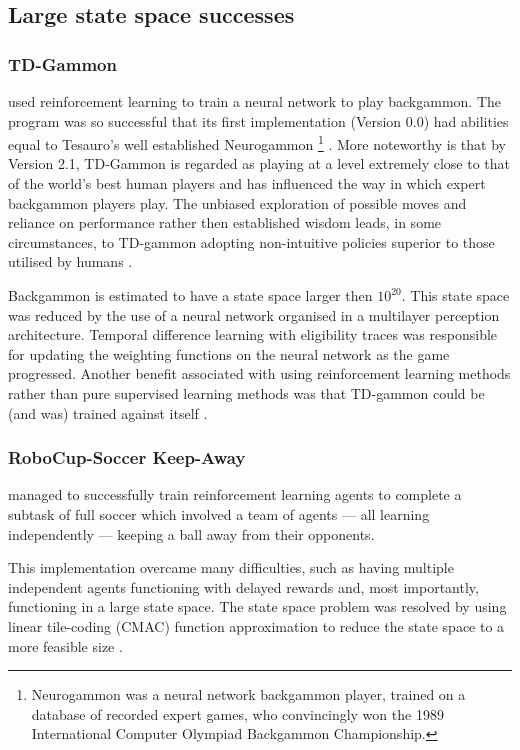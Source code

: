 \documentclass{rucsthesis}
\begin{document}
\subsection{Large state space successes}

\subsubsection{TD-Gammon}

 \cite{tdgammon} used reinforcement learning to train a neural network to play backgammon. The program was so successful that its first implementation (Version 0.0) had abilities equal to Tesauro's well established Neurogammon \footnote{Neurogammon was a neural network backgammon player, trained on a database of recorded expert games, who convincingly won the 1989 International Computer Olympiad Backgammon Championship.} \citep{tdgammon}.  More noteworthy is that by Version 2.1, TD-Gammon is regarded as playing at a level extremely close to that of the world's best human players and has influenced the way in which expert backgammon players play\citep{tdgammon}. The unbiased exploration of possible moves and reliance on performance rather then established wisdom leads, in some circumstances, to TD-gammon adopting non-intuitive policies superior to those utilised by humans \citep{tdgammon}.

Backgammon is estimated to have a state space larger then $10^{20}$. This state space was reduced by the use of a neural network organised in a multilayer perception architecture. Temporal difference learning with eligibility traces was responsible for updating the weighting functions on the neural network as the game progressed. Another benefit associated with using reinforcement learning methods rather than pure supervised learning methods was that TD-gammon could be (and was) trained against itself \citep{tdgammon}.

\subsubsection{RoboCup-Soccer Keep-Away}

\cite{keepaway} managed to successfully train reinforcement learning agents to complete a subtask of full soccer which involved a team of agents --- all learning independently --- keeping a ball away from their opponents. 

This implementation overcame many difficulties, such as having multiple independent agents functioning with delayed rewards and, most importantly, functioning in a large state space. The state space problem was resolved by using linear tile-coding (CMAC) function approximation to reduce the state space to a more feasible size \citep{keepaway}.
\end{document}
